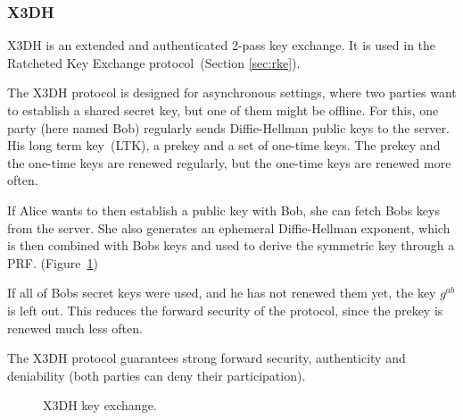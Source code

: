 \subsubsection{X3DH}
X3DH is an extended and authenticated 2-pass key exchange. 
It is used in the Ratcheted Key Exchange protocol~(Section \ref{sec:rke}).

The X3DH protocol is designed for asynchronous settings, where two parties want to establish a shared secret key, but one of them might be offline.
For this, one party (here named Bob) regularly sends Diffie-Hellman public keys to the server.
His long term key~(LTK), a prekey and a set of one-time keys. 
The prekey and the one-time keys are renewed regularly, but the one-time keys are renewed more often.

If Alice wants to then establish a public key with Bob, she can fetch Bobs keys from the server.
She also generates an ephemeral Diffie-Hellman exponent, which is then combined with Bobs keys and used to derive the symmetric key through a PRF. (Figure~\ref{fig:ake:x3dh})

If all of Bobs secret keys were used, and he has not renewed them yet, the key $g^{ab}$ is left out.
This reduces the forward security of the protocol, since the prekey is renewed much less often.

The X3DH protocol guarantees strong forward security, authenticity and deniability (both parties can deny their participation).

\begin{figure}[!ht]
    \centering
    
    \caption{X3DH key exchange.}
    \label{fig:ake:x3dh}
\end{figure}
